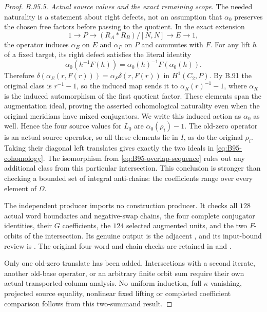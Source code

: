 \begin{proof}
\emph{B.95.5. Actual source values and the exact remaining scope.}
The needed naturality is a statement about right defects, not an
assumption that $\alpha_0$ preserves the chosen free factors before
passing to the quotient. In the exact extension
\[
 1\longrightarrow P\longrightarrow
   (R_A*R_B)/[N,N]\longrightarrow E\longrightarrow1,
\]
the operator induces $\alpha_E$ on $E$ and $\alpha_P$ on $P$ and
commutes with $F$. For any lift $h$ of a fixed target, its right
defect satisfies the literal identity
\[
 \alpha_0(h^{-1}F(h))=\alpha_0(h)^{-1}F(\alpha_0(h)).
\]
Therefore
$\delta(\alpha_E(r,F(r)))=\alpha_P\delta(r,F(r))$ in
$H^1(C_2,P)$. By B.91 the original class is $r^{-1}-1$, so
the induced map sends it to $\alpha_R(r)^{-1}-1$, where
$\alpha_R$ is the induced automorphism of the first quotient
factor. These elements span the augmentation ideal, proving the
asserted cohomological naturality even when the original meridians
have mixed conjugators. We write this induced action as $\alpha_0$
as well. Hence the four source values for $L_0$ are
$\alpha_0(\rho_i)-1$. The old-zero operator is an actual source
operator, so all these elements lie in $I$, as do the original
$\rho_i$. Taking their diagonal left translates gives exactly the
two ideals in \eqref{eq:B95-cohomology}. The isomorphism from
\eqref{eq:B95-overlap-sequence} rules out any additional class from
this particular intersection. This conclusion is stronger than
checking a bounded set of integral anti-chains: the coefficients
range over every element of $\Omega$.

The independent producer
imports no construction producer. It checks all $128$ actual word
boundaries and negative-swap chains, the four complete conjugator
identities, their $G$ coefficients, the $124$ selected augmented
units, and the two $F$-orbits of the intersection. Its genuine
output is the adjacent , and its input-bound review is
.
The original four word and chain checks are retained in
 and
.

Only one old-zero translate has been added. Intersections with a
second iterate, another old-base operator, or an arbitrary finite
orbit sum require their own actual transported-column analysis.
No uniform induction, full $\kappa$ vanishing, projected source
equality, nonlinear fixed lifting or completed coefficient comparison
follows from this two-summand result.
\end{proof}
